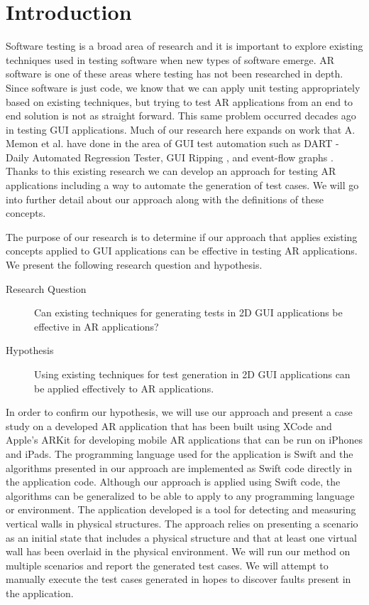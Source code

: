 \documentclass[final,3p]{CSP}
\begin{document}
\section{Introduction}
\noindent

Software testing is a broad area of research and it is important to explore existing techniques used in testing software when new types of software emerge.  AR software is one of these areas where testing has not been researched in depth.  Since software is just code, we know that we can apply unit testing appropriately based on existing techniques, but trying to test AR applications from an end to end solution is not as straight forward.  This same problem occurred decades ago in testing GUI applications.  Much of our research here expands on work that A. Memon et al. have done in the area of GUI test automation such as DART \cite{DARTFramework} - Daily Automated Regression Tester, GUI Ripping \cite{GUIRip}, and event-flow graphs \cite{EventFlow}.  Thanks to this existing research we can develop an approach for testing AR applications including a way to automate the generation of test cases.  We will go into further detail about our approach along with the definitions of these concepts.

The purpose of our research is to determine if our approach that applies existing concepts applied to GUI applications can be effective in testing AR applications.  We present the following research question and hypothesis.

\begin{description}
\item[Research Question] Can existing techniques for generating tests in 2D GUI applications be effective in AR applications?
\item[Hypothesis] Using existing techniques for test generation in 2D GUI applications can be applied effectively to AR applications.
\end{description}

In order to confirm our hypothesis, we will use our approach and present a case study on a developed AR application that has been built using XCode \cite{xcode} and Apple's ARKit \cite{ARKit} for developing mobile AR applications that can be run on iPhones and iPads.  The programming language used for the application is Swift \cite{swift} and the algorithms presented in our approach are implemented as Swift code directly in the application code.  Although our approach is applied using Swift code, the algorithms can be generalized to be able to apply to any programming language or environment.  The application developed is a tool for detecting and measuring vertical walls in physical structures.  The approach relies on presenting a scenario as an initial state that includes a physical structure and that at least one virtual wall has been overlaid in the physical environment.  We will run our method on multiple scenarios and report the generated test cases.  We will attempt to manually execute the test cases generated in hopes to discover faults present in the application.
\end{document}
